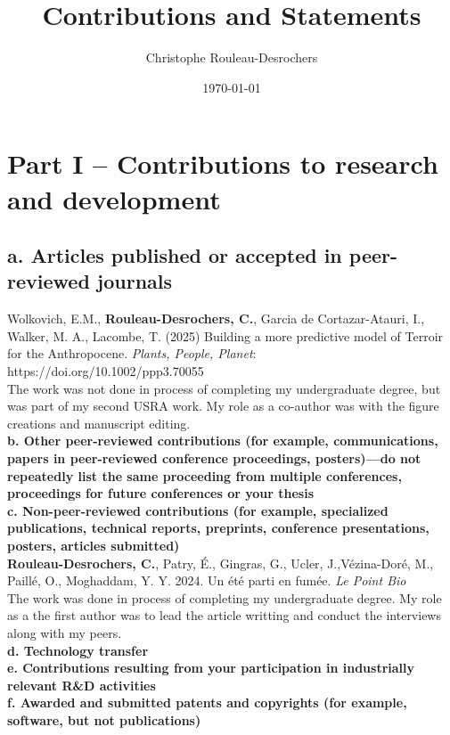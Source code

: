 \documentclass{article}
\title{Contributions and Statements}
\date{\today}
\author{Christophe Rouleau-Desrochers}
\begin{document}

\maketitle


\section*{Part I – Contributions to research and development}
\subsection*{a. Articles published or accepted in peer-reviewed journals} 
Wolkovich, E.M., \textbf{Rouleau-Desrochers, C.}, Garcia de Cortazar-Atauri, I., Walker, M. A., Lacombe,
T. (2025) Building a more predictive model of Terroir for the Anthropocene. \textit{Plants, People, Planet}: https://doi.org/10.1002/ppp3.70055 \\
The work was not done in process of completing my undergraduate degree, but was part of my second USRA work. My role as a co-author was with the figure creations and manuscript editing. \\
\textbf{b. Other peer-reviewed contributions (for example, communications, papers in peer-reviewed conference proceedings, posters)—do not repeatedly list the same proceeding from multiple conferences, proceedings for future conferences or your thesis} \\
\textbf{c. Non-peer-reviewed contributions (for example, specialized publications, technical reports, preprints, conference presentations, posters, articles submitted)} \\
\textbf{Rouleau-Desrochers, C.}, Patry, É., Gingras, G., Ucler, J.,Vézina-Doré, M., Paillé, O., Moghaddam, Y. Y. 2024. Un été parti en fumée. \textit{Le Point Bio} \\
The work was done in process of completing my undergraduate degree. My role as a the first author was to lead the article writting and conduct the interviews along with my peers.\\
\textbf{d. Technology transfer} \\ 
\textbf{e. Contributions resulting from your participation in industrially relevant R\&D activities} \\ 
\textbf{f. Awarded and submitted patents and copyrights (for example, software, but not publications)}
\end{document}
